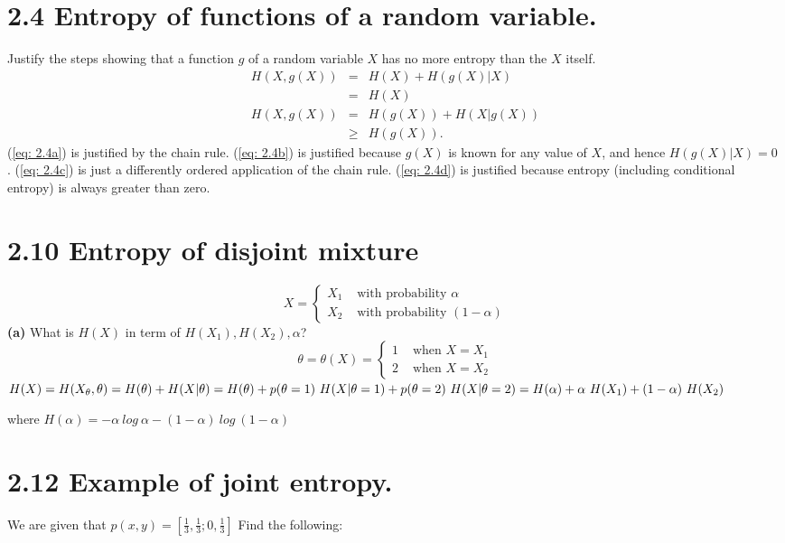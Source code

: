 \documentclass[10pt]{article}
\newcommand{\pref}[1]{{(\ref{#1})}}
\begin{document}
\begin{tiny}
\begin{multicols}{3}
\section*{2.4 Entropy of functions of a random variable.}
Justify the steps showing that a function $g$ of a random variable $X$ has no
more entropy than the $X$ itself.
\begin{eqnarray}
H(X,g(X))  &=& H(X) + H(g(X) | X) \label{eq: 2.4a} \\
    &=& H(X) \label{eq: 2.4b} \\
    H(X,g(X)) &=& H(g(X))+H(X|g(X)) \label{eq: 2.4c} \\
    &\geq& H(g(X)) \label{eq: 2.4d}.
\end{eqnarray}
\pref{eq: 2.4a} is justified by the chain rule.
\pref{eq: 2.4b} is justified because $g(X)$ is known for any value of $X$,
and hence $H(g(X)|X)=0$ . 
\pref{eq: 2.4c} is just a differently ordered application of the chain rule.
\pref{eq: 2.4d} is justified because entropy (including conditional entropy) is always greater
than zero.

\section*{2.10 Entropy of disjoint mixture}
\begin{equation*}
X=\begin{cases} 
    X_1 & \text{ with probability } \alpha \\
    X_2 & \text{ with probability } (1-\alpha) 
\end{cases} 
\end{equation*}
\textbf{(a)} What is $H(X)$ in term of $H(X_1), H(X_2), \alpha$? 
\begin{equation}
    \theta = \theta(X) = 
        \begin{cases}
            1 & \text{ when } X=X_{1}\\ 
            2 & \text{ when }  X = X_{2} \end{cases}
    \label{eq: theta of X}
\end{equation}
\(
	H(X) = H(X_\theta,\theta) = H(\theta) + H(X|\theta) \\
	= H(\theta)+p(\theta = 1)\ H(X|\theta=1)+p(\theta=2)\ H(X|\theta=2) \\
	= H(\alpha) + \alpha\ H(X_{1}) + (1-\alpha)\ H(X_{2}) \)

where 
\(H(\alpha) = -\alpha\ log\ \alpha - (1 - \alpha )\ log\ (1-\alpha)\)
             
\section*{2.12 Example of joint entropy.}
We are given that  \( p(x,y)=\left[ \frac{1}{3},\frac{1}{3};0,\frac{1}{3} \right] \) Find the following:


\end{multicols}
\end{tiny}
\end{document}
